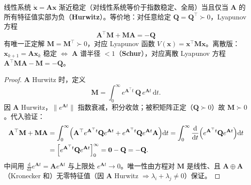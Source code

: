 \begin{theorem}
\label{thm:ctrl-lyap-eq}
线性系统 $\dot{\mathbf{x}}=\mathbf{A}\mathbf{x}$ 渐近稳定（对线性系统等价于指数稳定、全局）当且仅当 $\mathbf{A}$ 的所有特征值实部为负（\textbf{Hurwitz}）。等价地：对任意给定 $\mathbf{Q}=\mathbf{Q}^\top\succ0$，Lyapunov 方程
\begin{equation}
  \boxed{\mathbf{A}^\top\mathbf{M}+\mathbf{M}\mathbf{A}=-\mathbf{Q}}
  \label{eq:ctrl-lyap-eq}
\end{equation}
有唯一正定解 $\mathbf{M}=\mathbf{M}^\top\succ0$，对应 Lyapunov 函数 $V(\mathbf{x})=\mathbf{x}^\top\mathbf{M}\mathbf{x}$。离散版：$\mathbf{x}_{k+1}=\mathbf{A}\mathbf{x}_k$ 稳定 $\iff$ $\mathbf{A}$ 谱半径 $<1$（\textbf{Schur}），对应离散 Lyapunov 方程 $\mathbf{A}^\top\mathbf{M}\mathbf{A}-\mathbf{M}=-\mathbf{Q}$。
\end{theorem}
\begin{proof}
$\mathbf{A}$ Hurwitz 时，定义
\begin{equation}
  \mathbf{M}=\int_0^\infty e^{\mathbf{A}^\top t}\,\mathbf{Q}\,e^{\mathbf{A}t}\,\mathrm dt.
  \label{eq:ctrl-lyap-int}
\end{equation}
因 $\mathbf{A}$ Hurwitz，$\|e^{\mathbf{A}t}\|$ 指数衰减，积分收敛；被积矩阵正定（$\mathbf{Q}\succ0$）故 $\mathbf{M}\succ0$。代入验证：
\begin{align}
  \mathbf{A}^\top\mathbf{M}+\mathbf{M}\mathbf{A}
  &=\int_0^\infty\!\Big(\mathbf{A}^\top e^{\mathbf{A}^\top t}\mathbf{Q}e^{\mathbf{A}t}+e^{\mathbf{A}^\top t}\mathbf{Q}e^{\mathbf{A}t}\mathbf{A}\Big)\mathrm dt
   =\int_0^\infty\frac{\mathrm d}{\mathrm dt}\Big(e^{\mathbf{A}^\top t}\mathbf{Q}e^{\mathbf{A}t}\Big)\mathrm dt\notag\\
  &=\Big[e^{\mathbf{A}^\top t}\mathbf{Q}e^{\mathbf{A}t}\Big]_0^\infty=\mathbf{0}-\mathbf{Q}=-\mathbf{Q}.
\end{align}
中间用 $\frac{\mathrm d}{\mathrm dt}e^{\mathbf{A}t}=\mathbf{A}e^{\mathbf{A}t}$ 与上限处 $e^{\mathbf{A}t}\to0$。唯一性由方程对 $\mathbf{M}$ 是线性、且 $\mathbf{A}\oplus\mathbf{A}$（Kronecker 和）无零特征值（因 $\mathbf{A}$ Hurwitz $\Rightarrow\lambda_i+\lambda_j\neq0$）保证。
\end{proof}


